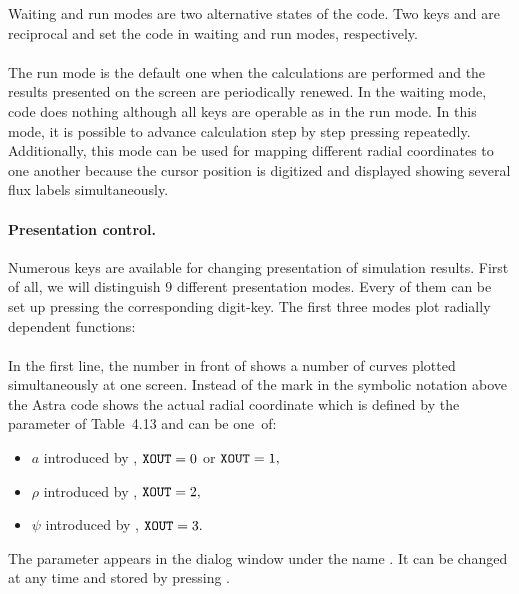 Waiting and run modes are two alternative states of the code. 
Two keys  and  are reciprocal and set the
code in waiting and run modes, respectively.  
\bigskip\\
\\[2ex]
The run mode is the default one when the calculations are performed and
the results presented on the screen are periodically renewed.
In the waiting mode, code does nothing although all keys are operable as
in the run mode.
In this mode, it is possible to advance calculation step by step
pressing  repeatedly.
Additionally, this mode can be used for mapping different radial
coordinates to one another because the cursor position is digitized and
displayed showing several flux labels simultaneously. 

\paragraph{Presentation control.}
Numerous keys are available for changing presentation of simulation
results. 
First of all, we will distinguish 9 different presentation modes.
Every of them can be set up pressing the corresponding digit-key.
The first three modes plot radially dependent functions:
\bigskip\\
\\[2ex]
In the first line, the number in front of \twd{*} shows a number of
curves plotted simultaneously at one screen.
Instead of the mark \twd{\#} in the symbolic notation above the Astra
code shows the actual radial coordinate which is defined by the
parameter  of Table~4.13 and can be one~of: 
\begin{itemize}
\vspace*{-1ex}
\item[--] $a$ introduced by , 
		${\tt XOUT}=0$ or ${\tt XOUT}=1,$ 
\vspace*{-1ex}
\item[--] $\rho$ introduced by , ${\tt XOUT}=2,$
\vspace*{-1ex}
\item[--] $\psi$ introduced by , ${\tt XOUT}=3.$
\end{itemize}
\vspace*{-1ex}
The parameter  appears in the dialog window  under
the name .
It can be changed at any time and stored by pressing .

